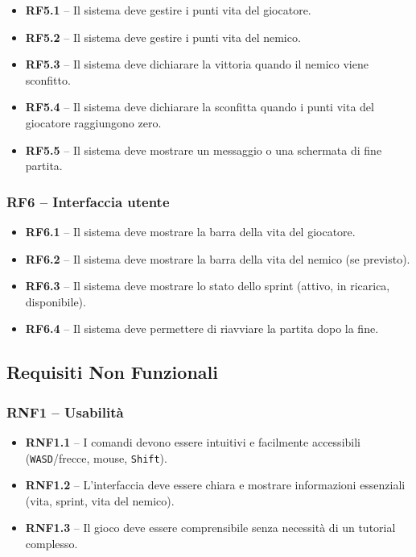 \documentclass[12pt,a4paper]{article}
\newcommand{\req}[2]{%
  \noindent\textbf{#1} -- #2\par\smallskip
}
\begin{document}
\begin{small}
\begin{itemize}[leftmargin=2em]
  \item \req{RF5.1}{Il sistema deve gestire i punti vita del giocatore.}
  \item \req{RF5.2}{Il sistema deve gestire i punti vita del nemico.}
  \item \req{RF5.3}{Il sistema deve dichiarare la vittoria quando il nemico viene sconfitto.}
  \item \req{RF5.4}{Il sistema deve dichiarare la sconfitta quando i punti vita del giocatore
    raggiungono zero.}
  \item \req{RF5.5}{Il sistema deve mostrare un messaggio o una schermata di fine partita.}
\end{itemize}

\subsubsection{RF6 – Interfaccia utente}

\begin{itemize}[leftmargin=2em]
  \item \req{RF6.1}{Il sistema deve mostrare la barra della vita del giocatore.}
  \item \req{RF6.2}{Il sistema deve mostrare la barra della vita del nemico (se previsto).}
  \item \req{RF6.3}{Il sistema deve mostrare lo stato dello sprint (attivo, in ricarica, disponibile).}
  \item \req{RF6.4}{Il sistema deve permettere di riavviare la partita dopo la fine.}
\end{itemize}
\subsection{Requisiti Non Funzionali}
\subsubsection{RNF1 – Usabilità}

\begin{itemize}[leftmargin=2em]
  \item \req{RNF1.1}{I comandi devono essere intuitivi e facilmente accessibili
    (\texttt{WASD}/frecce, mouse, \texttt{Shift}).}
  \item \req{RNF1.2}{L'interfaccia deve essere chiara e mostrare informazioni essenziali
    (vita, sprint,  vita del nemico).}
  \item \req{RNF1.3}{Il gioco deve essere comprensibile senza necessità di un tutorial complesso.}
\end{itemize}


\end{small}
\end{document}
